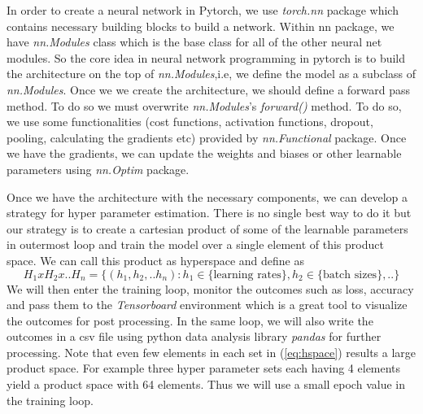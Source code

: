 \documentclass[12pt]{article}
\begin{document}

In order to create a neural network in Pytorch, we use \textit{torch.nn} package which contains necessary building blocks to build a network. Within nn package, we have \textit{nn.Modules} class which is the base class for all of the other neural net modules. So the core idea in neural network programming in pytorch is to build the architecture on the top of \textit{nn.Modules},i.e, we define the model as a subclass of \textit{nn.Modules}. Once we we create the architecture, we should define a forward pass method. To do so we must overwrite \textit{nn.Modules}'s \textit{forward()} method. To do so, we use some functionalities (cost functions, activation functions, dropout, pooling, calculating the gradients etc) provided by \textit{nn.Functional} package. Once we have the gradients, we can update the weights and biases or other learnable parameters using \textit{nn.Optim} package. 

Once we have the architecture with the necessary components, we can develop a strategy for hyper parameter estimation. There is no single best way to do it but our strategy is to create a cartesian product of some of the learnable parameters in outermost loop and train the model over a single element of this product space. We can call this product as hyperspace and define as
\begin{equation}
\label{eq:hspace}
H_{1}xH_{2}x..H_{n} = \{(h_{1},h_{2},..h_{n}): h_{1} \in \{\text{learning rates}\}, h_{2}\in \{\text{batch sizes}\}, .. \}
\end{equation}
We will then enter the training loop, monitor the outcomes such as loss, accuracy and pass them to the \textit{Tensorboard} environment \cite{tb} which is a great tool to visualize the outcomes for post processing. In the same loop, we will also write the outcomes in a csv file using python data analysis library \textit{pandas} \cite{pandas} for further processing. Note that even few elements in each set in (\ref{eq:hspace}) results a large product space. For example three hyper parameter sets each having 4 elements yield a product space with 64 elements. Thus we will use a small epoch value in the training loop. 
\end{document}
